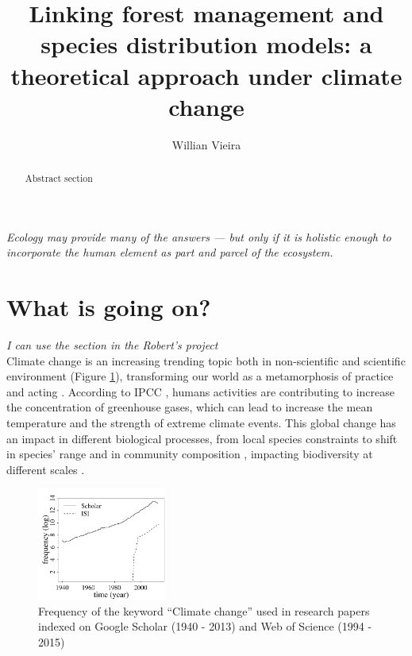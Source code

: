 




\title{Linking forest management and species distribution models: a theoretical approach under climate change}

\author{Willian Vieira}

\maketitle

\begin{abstract}

Abstract section

\end{abstract}

\begin{displayquote}
\centering\textit{Ecology may provide many of the answers — but only if it is holistic enough to incorporate the human element as part and parcel of the ecosystem.} \\ 
\end{displayquote}

\section{What is going on?}

\textit{I can use the section in the Robert's project}\\
Climate change is an increasing trending topic both in non-scientific \citep{Capstick2015} and scientific environment (Figure \ref{fig:fig1}), transforming our world as a metamorphosis of practice and acting \citep{Beck2016}.
According to IPCC \citep{Cubasch2013}, humans activities are contributing to increase the concentration of greenhouse gases, which can lead to increase the mean temperature and the strength of extreme climate events.
This global change has an impact in different biological processes, from local species constraints \citep[e.g. low regeneration][]{Treyger2011} to shift in species' range \citep{Boisvert-Marsh2014,Monleon2015} and in community composition \citep{Dieleman2015}, impacting biodiversity at different scales \citep{Penuelas2013}.

\begin{figure}
    \centering
    \includegraphics[width=0.38\textwidth]{img/fig1_em.pdf}
    \caption{Frequency of the keyword ``Climate change'' used in research papers indexed on Google Scholar (1940 - 2013) and Web of Science (1994 - 2015)}
    \label{fig:fig1}
\end{figure}

